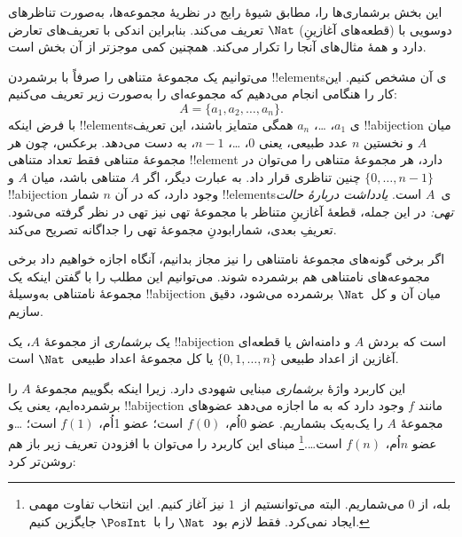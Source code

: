 \documentclass[../../../include/open-logic-section]{subfiles}
\begin{document}


\begin{editorial}
  این بخش برشماری‌ها را، مطابق شیوهٔ رایج در نظریهٔ مجموعه‌ها، به‌صورت
  تناظرهای دوسویی با (قطعه‌های آغازینِ) $\Nat$ تعریف می‌کند. بنابراین
  اندکی با تعریف‌های  تعارض دارد و همهٔ مثال‌های آنجا
  را تکرار می‌کند. همچنین کمی موجزتر از آن بخش است.
\end{editorial}

می‌توانیم یک مجموعهٔ متناهی را صرفاً با برشمردن
!!{element}sی آن مشخص کنیم. این کار را هنگامی انجام می‌دهیم که مجموعه‌ای را
به‌صورت زیر تعریف می‌کنیم:
\[
  A = \{a_1, a_2, \ldots, a_n\}.
\]
با فرض اینکه !!{element}sی $a_1$، \dots، $a_n$ همگی متمایز باشند،
این تعریف !!a{bijection} میان $A$ و نخستین $n$ عدد طبیعی، یعنی $0$،
\dots، $n-1$، به دست می‌دهد. برعکس، چون هر مجموعهٔ متناهی فقط تعداد
متناهی !!{element} دارد، هر مجموعهٔ متناهی را می‌توان در چنین تناظری
قرار داد. به عبارت دیگر، اگر $A$ متناهی باشد، میان $A$ و
$\{0, \dots, n-1\}$ !!a{bijection} وجود دارد، که در آن $n$ شمار
!!{element}sی~$A$ است.
\emph{یادداشت دربارهٔ حالت تهی:} در این جمله، قطعهٔ آغازینِ متناظر با
مجموعهٔ تهی نیز تهی در نظر گرفته می‌شود. تعریفِ بعدی، شمارابودنِ مجموعهٔ
تهی را جداگانه تصریح می‌کند.

اگر برخی گونه‌های مجموعهٔ نامتناهی را نیز مجاز بدانیم، آنگاه اجازه
خواهیم داد برخی مجموعه‌های نامتناهی هم برشمرده شوند. می‌توانیم این مطلب
را با گفتن اینکه یک مجموعهٔ نامتناهی به‌وسیلهٔ !!a{bijection} میان آن
و کل~$\Nat$ برشمرده می‌شود، دقیق سازیم.

\begin{defn}
یک \emph{برشماری} از مجموعهٔ $A$، یک !!a{bijection} است که بردش $A$
و دامنه‌اش یا قطعه‌ای آغازین از اعداد طبیعی $\{0,
1, \ldots, n\}$ {یا} کل مجموعهٔ اعداد طبیعی~$\Nat$ است.
\end{defn}

\begin{explain}
این کاربرد واژهٔ \emph{برشماری} مبنایی شهودی دارد. زیرا اینکه بگوییم
مجموعهٔ $A$ را برشمرده‌ایم، یعنی یک !!a{bijection} مانند $f$ وجود دارد
که به ما اجازه می‌دهد عضوهای مجموعهٔ $A$ را یک‌به‌یک بشماریم. عضو
$0$اُم، $f(0)$ است؛ عضو 1اُم، $f(1)$ است؛ \ldots و عضو $n$اُم،
$f(n)$ است\ldots.\footnote{بله، از $0$ می‌شماریم. البته می‌توانستیم
از~$1$ نیز آغاز کنیم. این انتخاب تفاوت مهمی ایجاد نمی‌کرد. فقط لازم
بود~$\Nat$ را با~$\PosInt$ جایگزین کنیم.} مبنای این کاربرد را می‌توان
با افزودن تعریف زیر باز هم روشن‌تر کرد:
\end{explain}
\end{document}
